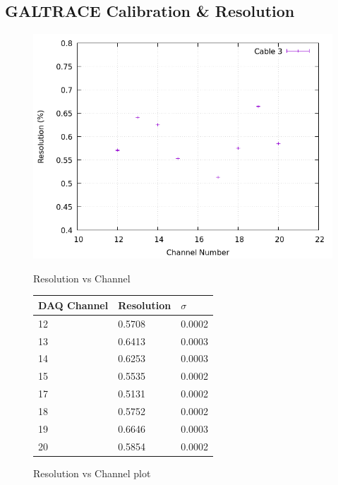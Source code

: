 \subsection{GALTRACE Calibration \& Resolution}

\begin{figure}[h]
  \centering
  \begin{minipage}[b]{0.45\textwidth}
    \includegraphics[width=\textwidth]{img/plot/am/3_res_am.png}
    \caption{Resolution vs Channel}
    \label{res:am3}
  \end{minipage}
  \hfill
  \begin{minipage}[b]{0.45\textwidth}
  \begin{tabular}{lll}
    DAQ Channel & Resolution & $\sigma$ \\
    \midrule
    12 & \num{0.5708} & 0.0002 \\
    13 & \num{0.6413} & 0.0003 \\
    14 & \num{0.6253} & 0.0003 \\
    15 & \num{0.5535} & 0.0002 \\
    17 & \num{0.5131} & 0.0002 \\
    18 & \num{0.5752} & 0.0002 \\
    19 & \num{0.6646} & 0.0003 \\
    20 & \num{0.5854} & 0.0002 \\
    \bottomrule
  \end{tabular}
  \caption{Resolution vs Channel plot}
  \label{res:plot:am3}
  \end{minipage}
\end{figure}

